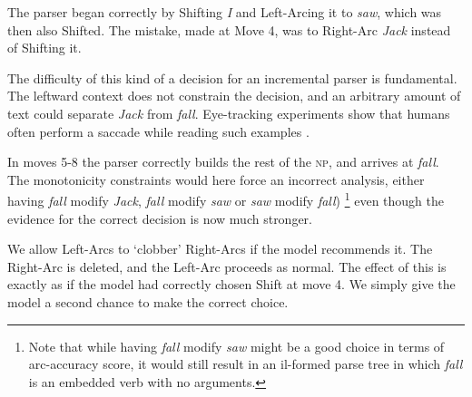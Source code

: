 \documentclass[11pt,letterpaper]{article}
\begin{document}
The parser began correctly by Shifting \emph{I}
and Left-Arcing it to \emph{saw}, which was then also Shifted. The mistake, made
at Move 4, was to Right-Arc \emph{Jack} instead of Shifting it.

The difficulty of this kind of a decision for an incremental parser is fundamental.
The leftward context does not constrain the decision, 
and an arbitrary amount of text could separate \emph{Jack} from
\emph{fall}. Eye-tracking
experiments show that humans often perform a saccade while reading such
examples \citep{FrazierRayner1982}.

In moves 5-8 the parser correctly builds the rest of the \textsc{np}, and arrives
at \emph{fall}. The monotonicity constraints would here force an incorrect
analysis,
either having \emph{fall} modify \emph{Jack}, \emph{fall} modify
\emph{saw} or \emph{saw} modify \emph{fall})
\footnote{Note that while having
\emph{fall} modify \emph{saw} might be a good choice in terms
of arc-accuracy score, it would still result in an il-formed parse tree in which
\emph{fall} is an embedded verb with no arguments.}
even though the evidence for the correct decision is now much stronger.

We allow Left-Arcs to `clobber' Right-Arcs if the model
recommends it. The Right-Arc is deleted, and the Left-Arc proceeds as normal. The
effect of this is exactly as if the model had correctly chosen Shift at
move 4. We simply give the model a second chance to make the correct choice.
\end{document}
